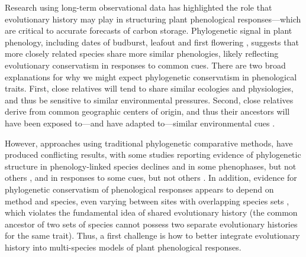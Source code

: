 \documentclass[11pt]{article}
\begin{document}
\par Research using long-term observational data has highlighted the role that evolutionary history may play in structuring plant phenological responses---which are critical to accurate forecasts of carbon storage. Phylogenetic signal in plant phenology, including dates of budburst, leafout and first flowering \citep{kochmer1986constraints,willis2008phylogenetic,davies2013phylogenetic}, suggests that more closely related species share more similar phenologies, likely reflecting evolutionary conservatism in responses to common cues. There are two broad explanations for why we might expect phylogenetic conservatism in phenological traits. First, close relatives will tend to share similar ecologies and physiologies, and thus be sensitive to similar environmental pressures. Second, close relatives derive from common geographic centers of origin, and thus their ancestors will have been exposed to---and have adapted to---similar environmental cues \citep{davies2013phylogenetic}. 

\par However, approaches using traditional phylogenetic comparative methods, have produced conflicting results, with some studies reporting evidence of phylogenetic structure in phenology-linked species declines \citep[e.g.,][]{willis2008phylogenetic} and in some phenophases, but not others \citep[e.g.,][]{CaraDonna2015}, and in responses to some cues, but not others \citep[e.g.,][]{yang2021afm}. In addition, evidence for phylogenetic conservatism of phenological responses appears to depend on method and species, even varying between sites with overlapping species sets \citep[e.g.,][]{rafferty2017global}, which violates the fundamental idea of shared evolutionary history (the common ancestor of two sets of species cannot possess two separate evolutionary histories for the same trait). Thus, a first challenge is how to better integrate evolutionary history into multi-species models of plant phenological responses.
\end{document}
